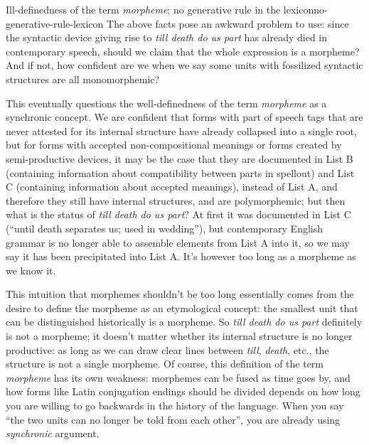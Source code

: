\documentclass[UTF8, a4paper, oneside, scheme=plain]{ctexrep}
\newcommand*{\term}[1]{\emph{#1}}
\newcommand{\corpus}[1]{\emph{#1}}
\begin{document}
\begin{theorybox}{Ill-definedness of the term \term{morpheme}; no generative rule in the lexicon}{no-generative-rule-lexicon}
    The above facts pose an awkward problem to use: 
    since the syntactic device giving rise to \corpus{till death do us part}
    has already died in contemporary speech, 
    should we claim that the whole expression is a morpheme?
    And if not, how confident are we 
    when we say some units with fossilized syntactic structures 
    are all monomorphemic?

    This eventually questions the well-definedness of the term \term{morpheme}
    as a synchronic concept.
    We are confident that 
    forms with part of speech tags that are never attested for its internal structure 
    have already collapsed into a single root, 
    but for forms with accepted non-compositional meanings
    or forms created by semi-productive devices,
    it may be the case that 
    they are documented in List B (containing information about compatibility between parts in spellout) 
    and List C (containing information about accepted meanings),
    instead of List A,
    and therefore they still have internal structures,
    and are polymorphemic;
    but then what is the status of \corpus{till death do us part}?
    At first it was documented in List C 
    (``until death separates us; used in wedding''),
    but contemporary English grammar 
    is no longer able to assemble elements from List A into it,
    so we may say it has been precipitated into List A.
    It's however too long as a morpheme as we know it.

    This intuition that morphemes shouldn't be too long 
    essentially comes from the desire to define the morpheme
    as an etymological concept:
    the smallest unit that can be distinguished historically
    is a morpheme.
    So \corpus{till death do us part} definitely is not a morpheme;
    it doesn't matter whether its internal structure 
    is no longer productive:
    as long as we can draw clear lines between \corpus{till}, \corpus{death}, etc., 
    the structure is not a single morpheme.
    Of course, this definition of the term \term{morpheme}
    has its own weakness: 
    morphemes can be fused as time goes by, 
    and how forms like Latin conjugation endings should be divided 
    depends on how long you are willing to go backwards 
    in the history of the language.
    When you say ``the two units can no longer be told from each other'',
    you are already using \emph{synchronic} argument. 
    

\end{theorybox}
\end{document}
